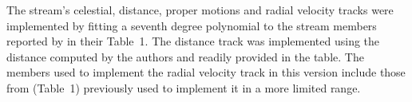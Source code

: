 The stream's celestial, distance, proper motions and radial velocity tracks were implemented by fitting a seventh degree polynomial to the stream members reported by \citet{Ibata2021} in their Table~1. The distance track was implemented using the distance computed by the authors and readily provided in the table. 
 The members used to implement the radial velocity track in this version include those from \citet{Ibata2019} (Table~1) previously used to implement it in a more limited range.
